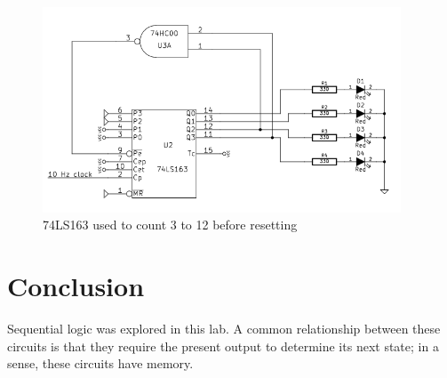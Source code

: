 \documentclass[11pt]{article}
\begin{document}
\begin{figure}[htpb]
	\centering
	\includegraphics[width=0.95\textwidth]{schematic_counter}
	\caption{74LS163 used to count 3 to 12 before resetting}
	\label{fig:counter}
\end{figure}

\section{Conclusion}

Sequential logic was explored in this lab. A common relationship between these circuits is that they require the present output to determine its next state; in a sense, these circuits have memory.
\end{document}
